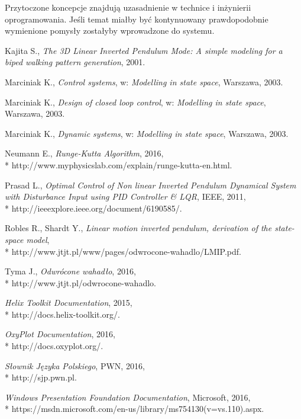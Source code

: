 \documentclass[12pt, twoside, openany]{report}
\theoremstyle{definition}
\begin{document}
Przytoczone koncepcje znajdują uzasadnienie w technice i inżynierii oprogramowania. Jeśli temat miałby być kontynuowany prawdopodobnie wymienione pomysły zostałyby wprowadzone do systemu.
	
\pagestyle{plain}
\begin{thebibliography}{11}

Kajita S., 
\emph{The 3D Linear Inverted Pendulum Mode: A simple modeling for a biped walking pattern generation}, 
2001.

Marciniak K., 
\emph{Control systems}, 
w: \emph{Modelling in state space}, 
Warszawa, 2003.

Marciniak K., 
\emph{Design of closed loop control}, 
w: \emph{Modelling in state space}, 
Warszawa, 2003.

Marciniak K., 
\emph{Dynamic systems}, 
w: \emph{Modelling in state space}, 
Warszawa, 2003.

Neumann E., 
\emph{Runge-Kutta Algorithm}, 
2016,
\\*
http://www.myphysicslab.com/explain/runge-kutta-en.html.

Prasad L., 
\emph{Optimal Control of Non linear Inverted Pendulum Dynamical System with Disturbance Input using PID Controller \& LQR}, 
IEEE, 2011,
\\*
http://ieeexplore.ieee.org/document/6190585/.

Robles R., Shardt Y., 
\emph{Linear motion inverted pendulum, derivation of the state-space model},
\\*
http://www.jtjt.pl/www/pages/odwrocone-wahadlo/LMIP.pdf.

 Tyma J., 
\emph{Odwrócone wahadło},
2016,
\\*
http://www.jtjt.pl/odwrocone-wahadlo.

\emph{Helix Toolkit Documentation}, 
2015,
\\*
http://docs.helix-toolkit.org/.

\emph{OxyPlot Documentation}, 
2016,
\\*
http://docs.oxyplot.org/.

\emph{Słownik Języka Polskiego}, 
PWN, 2016,
\\*
http://sjp.pwn.pl.

\emph{Windows Presentation Foundation Documentation}, 
Microsoft, 2016,
\\*
https://msdn.microsoft.com/en-us/library/ms754130(v=vs.110).aspx.


\end{thebibliography}
\end{document}
